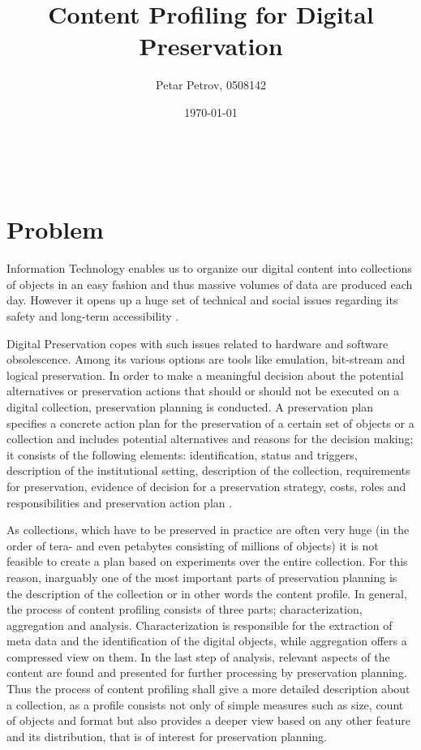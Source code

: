 \documentclass[a4paper,12pt]{scrartcl} %
\title{Content Profiling for Digital Preservation}
\author{Petar Petrov, 0508142}
\date{\today}
\makeatletter
\renewcommand{\maketitle}{\begingroup
    \let\footnotesize\small
    \let\footnoterule\relax
    \parindent \z@
    \reset@font
    \vskip 1\p@
    \begin{flushleft}
      \LARGE
      \strut\@title
    \end{flushleft}
    \@author \\
    \@date
    \vskip 40\p@
  \endgroup
  \setcounter{footnote}{0}%
}
\makeatother
\begin{document}
\maketitle

\section*{Problem}
Information Technology enables us to organize our digital content into collections of objects in an easy fashion and thus massive volumes of data are produced each day.
However it opens up a huge set of technical and social issues regarding its safety and long-term accessibility \cite{Lorie:2001:LTP:379437.379726}.

Digital Preservation copes with such issues related to hardware and software obsolescence. Among its various
options are tools like emulation, bit-stream and logical preservation. In order to make a meaningful decision
about the potential alternatives or preservation actions that should or should not be executed on a
digital collection, preservation planning is conducted. A preservation plan specifies a concrete action plan for the preservation
of a certain set of objects or a collection and includes potential alternatives and reasons for the decision making; it
consists of the following elements: identification, status and triggers, description of the institutional setting, description of the collection, requirements for preservation, evidence of decision for a preservation strategy, costs, roles and responsibilities and preservation action plan \cite{Becker:2009fk}. 

As collections, which have to be preserved in practice are often very huge (in the order of tera- and even petabytes consisting of millions of objects) it is not feasible to create a plan based on experiments over the entire collection. For this reason, inarguably one of the most important parts of preservation planning is the description of the collection or in other words the content profile. In general, the process of content profiling consists of three parts; characterization, aggregation and analysis. Characterization is responsible for the extraction of meta data and the identification of the digital objects, while aggregation offers a compressed view on them. In the last step of analysis, relevant aspects of the content are found and presented for further processing by preservation planning. Thus the process of content profiling shall give a more detailed description about a collection, as a profile consists not only of simple measures such as size, count of objects and format but also provides a deeper view based on any other feature and its distribution, that is of interest for preservation planning.
\end{document}
